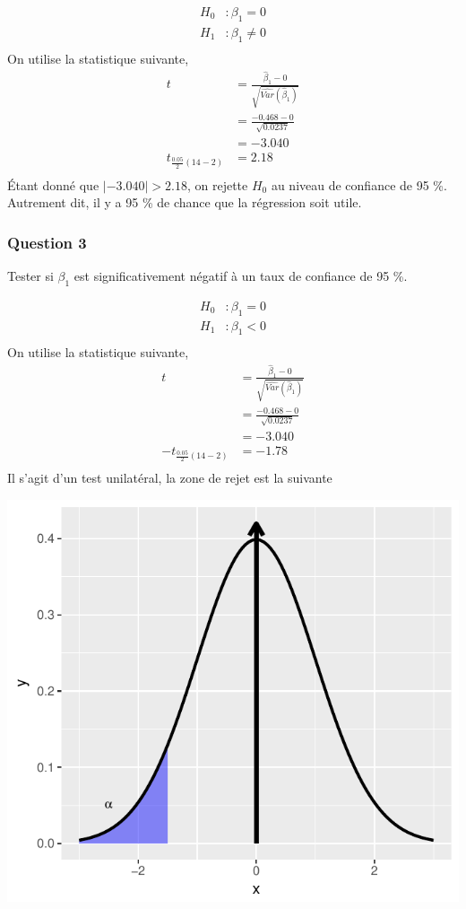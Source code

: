 \documentclass[11pt,french]{report}
\begin{document}
\begin{align*}
H_0 &: \beta_1 = 0\\
H_1 &: \beta_1 \neq 0 \\
\end{align*}
On utilise la statistique suivante,
\begin{align*}
t &= \frac{\hat{\beta}_1 - 0 }{\sqrt{\widehat{Var}(\hat{\beta}_1)}} \\
&= \frac{-0.468 - 0}{\sqrt{0.0237}}\\
&= -3.040\\
t_{\frac{0.05}{2}(14-2)} &= 2.18\\
\end{align*}
Étant donné que $|-3.040| > 2.18$, on rejette $H_0$ au niveau de confiance de 95 \%. Autrement dit, il y a 95 \% de chance que la régression soit utile.

\subsubsection*{Question 3}
Tester si $\beta_1$ est significativement négatif à un taux de confiance de 95 \%.

\begin{align*}
H_0 &: \beta_1 = 0\\
H_1 &: \beta_1 < 0 \\
\end{align*}
On utilise la statistique suivante,
\begin{align*}
t &= \frac{\hat{\beta}_1 - 0 }{\sqrt{\widehat{Var}(\hat{\beta}_1)}} \\
&= \frac{-0.468 - 0}{\sqrt{0.0237}} \\
&= -3.040 \\
-t_{\frac{0.05}{2}(14-2)} &= -1.78 \\
\end{align*}
Il s'agit d'un test unilatéral, la zone de rejet est la suivante

\includegraphics{notes_de_cours-016}
\end{document}
